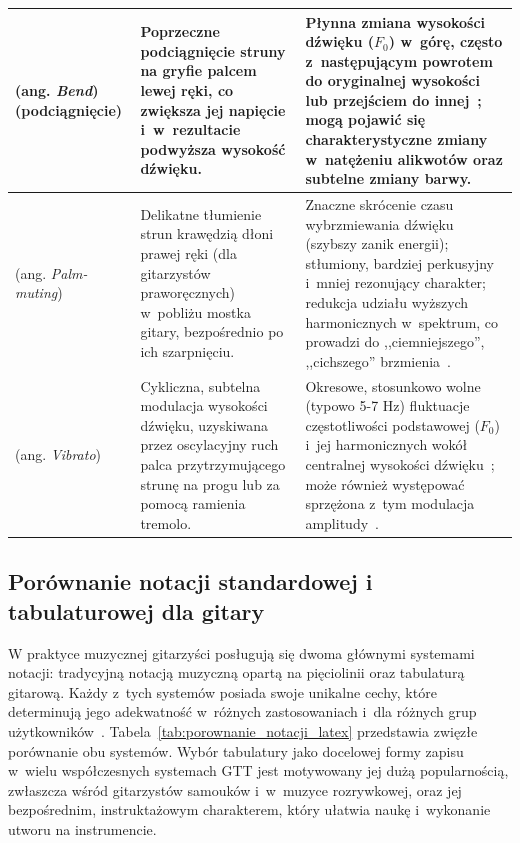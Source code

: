 \begin{longtable}{|p{}|p{}|p{}|}
    \hline
    (ang. \textit{Bend}) (podciągnięcie) & Poprzeczne podciągnięcie struny na gryfie palcem lewej ręki, co zwiększa jej napięcie i~w~rezultacie podwyższa wysokość dźwięku.
    & Płynna zmiana wysokości dźwięku ($F_0$) w~górę, często z~następującym powrotem do oryginalnej wysokości lub przejściem do innej~\autocite{Su2014SparseCepstral,Reboursiere2011GuitarController};
    mogą pojawić się charakterystyczne zmiany w~natężeniu alikwotów oraz subtelne zmiany barwy.
    \\
    \hline
    (ang. \textit{Palm-muting}) & Delikatne tłumienie strun krawędzią dłoni prawej ręki (dla gitarzystów praworęcznych) w~pobliżu mostka gitary, bezpośrednio po ich szarpnięciu.
    & Znaczne skrócenie czasu wybrzmiewania dźwięku (szybszy zanik energii); stłumiony, bardziej perkusyjny i~mniej rezonujący charakter;
    redukcja udziału wyższych harmonicznych w~spektrum, co prowadzi do ,,ciemniejszego'', ,,cichszego'' brzmienia~\autocite{Su2014SparseCepstral}.
    \\
    \hline
    (ang. \textit{Vibrato}) & Cykliczna, subtelna modulacja wysokości dźwięku, uzyskiwana przez oscylacyjny ruch palca przytrzymującego strunę na progu lub za pomocą ramienia tremolo.
    & Okresowe, stosunkowo wolne (typowo 5-7 Hz) fluktuacje częstotliwości podstawowej ($F_0$) i~jej harmonicznych wokół centralnej wysokości dźwięku~\autocite{Anand2012Vibrato,HyrkasSmyth2024Vibrato};
    może również występować sprzężona z~tym modulacja amplitudy~\autocite{Anand2012Vibrato,HyrkasSmyth2024Vibrato}.
    \\
\end{longtable}

\subsection{Porównanie notacji standardowej i tabulaturowej dla gitary}
\label{ssec:porownanie_notacji_gitara}

W praktyce muzycznej gitarzyści posługują się dwoma głównymi systemami notacji: tradycyjną notacją muzyczną opartą na pięciolinii oraz tabulaturą gitarową. Każdy z~tych systemów posiada swoje unikalne cechy, które determinują jego adekwatność w~różnych zastosowaniach i~dla różnych grup użytkowników~\autocite{Wiggins2019TabCNN}. Tabela~\ref{tab:porownanie_notacji_latex} przedstawia zwięzłe porównanie obu systemów. Wybór tabulatury jako docelowej formy zapisu w~wielu współczesnych systemach GTT jest motywowany jej dużą popularnością, zwłaszcza wśród gitarzystów samouków i~w~muzyce rozrywkowej, oraz jej bezpośrednim, instruktażowym charakterem, który ułatwia naukę i~wykonanie utworu na instrumencie.

